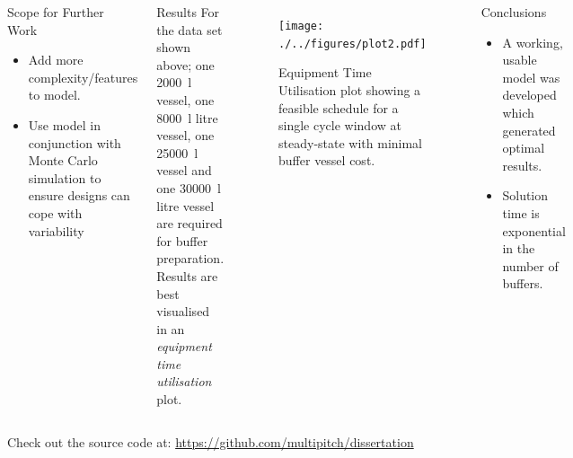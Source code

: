 \documentclass[final]{beamer}
\begin{document}
\begin{frame}[t]
\begin{columns}[t]
\begin{block}{\huge Scope for Further Work}
\begin{itemize}
                        \item Add more complexity/features to model.
                        \item Use model in conjunction with Monte Carlo
                            simulation to ensure designs can cope with
                            variability
                    \end{itemize}
                \end{block}
                \begin{block}{\huge Results}
                    For the data set shown above; one \SI{2000}{\litre} vessel,
                    one \SI{8000}{\litre} litre vessel, one \SI{25000}{\litre}
                    vessel and one \SI{30000}{\litre} litre vessel are
                    required for buffer preparation.
                    Results are best visualised in an \emph{equipment time
                    utilisation} plot.
                \end{block}
                \begin{figure}
                    \texttt{[image: ./../figures/plot2.pdf]}
                    \captionsetup{justification=centering}
                    \caption{\Large Equipment Time Utilisation
                    plot showing a feasible schedule for a single cycle window
                    at steady-state with minimal buffer vessel cost.}
                \end{figure}
                \begin{block}{\huge Conclusions}
                    \begin{itemize}
                        \item A working, usable model was developed which
                            generated optimal results.
                        \item Solution time is exponential in the number of
                            buffers.
                    \end{itemize}
                \end{block}
        \end{columns}
    
    \vspace{0.3cm}
    
    \large\centering Check out the source code at:
    \url{https://github.com/multipitch/dissertation}
    \end{frame}
\end{document}

